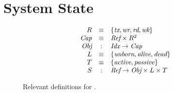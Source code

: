 \section{System State}

\begin{figure}
  \centering
    \[
    \begin{array}{rcl}
      R{} & \equiv & \{\textit{tx}{} , \textit{wr}{} , \textit{rd}{} , \textit{wk}{} \} \\
      \textit{Cap}{} & \equiv & \textit{Ref}{} \times R^{2}{} \\
      \textit{Obj}{}  & : & \textit{Idx}{} \rightarrow \textit{Cap}{} \\
      L{} & \equiv & \{\textit{unborn}{} , \textit{alive}{} , \textit{dead}{}\} \\
      T{} & \equiv & \{\textit{active}{} , \textit{passive}{}\} \\
      S{} & : & \textit{Ref}{} \rightarrow \textit{Obj}{} \times L{} \times T{}
    \end{array}
    \]
  \caption{Relevant definitions for \TMsystemStates{}. \label{fig:sketch:systemState}}
\end{figure}

